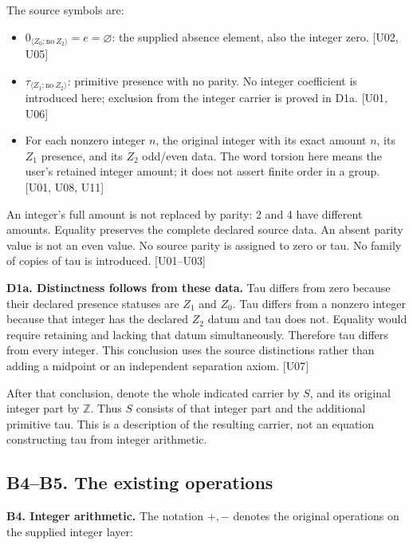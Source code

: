 The source symbols are:

\begin{itemize}

\item
  \(0_{\langle Z_0;\mathrm{no}\ Z_2\rangle}=e=\varnothing\): the
  supplied absence element, also the integer zero. {[}U02, U05{]}
\item
  \(\tau_{\langle Z_1;\mathrm{no}\ Z_2\rangle}\): primitive presence
  with no parity. No integer coefficient is introduced here; exclusion
  from the integer carrier is proved in D1a. {[}U01, U06{]}
\item
  For each nonzero integer \(n\), the original integer with its exact
  amount \(n\), its \(Z_1\) presence, and its \(Z_2\) odd/even data. The
  word torsion here means the user's retained integer amount; it does
  not assert finite order in a group. {[}U01, U08, U11{]}
\end{itemize}

An integer's full amount is not replaced by parity: 2 and 4 have
different amounts. Equality preserves the complete declared source data.
An absent parity value is not an even value. No source parity is
assigned to zero or tau. No family of copies of tau is introduced.
{[}U01--U03{]}

\textbf{D1a. Distinctness follows from these data.} Tau differs from
zero because their declared presence statuses are \(Z_1\) and \(Z_0\).
Tau differs from a nonzero integer because that integer has the declared
\(Z_2\) datum and tau does not. Equality would require retaining and
lacking that datum simultaneously. Therefore tau differs from every
integer. This conclusion uses the source distinctions rather than adding
a midpoint or an independent separation axiom. {[}U07{]}

After that conclusion, denote the whole indicated carrier by \(S\), and
its original integer part by \(\mathbb Z\). Thus \(S\) consists of that
integer part and the additional primitive tau. This is a description of
the resulting carrier, not an equation constructing tau from integer
arithmetic.

\subsection{B4--B5. The existing
operations}\label{uad-b4b5.-the-existing-operations}

\textbf{B4. Integer arithmetic.} The notation \(+, -\) denotes the
original operations on the supplied integer layer:

